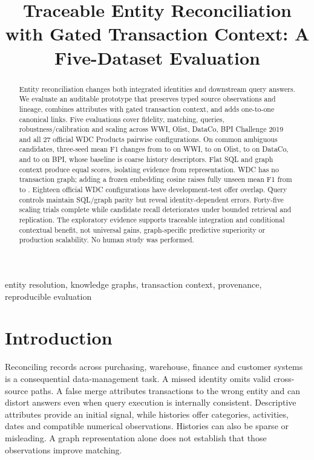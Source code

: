 \documentclass[conference,letterpaper]{IEEEtran}
\title{Traceable Entity Reconciliation with Gated Transaction Context: A Five-Dataset Evaluation}
\author{\IEEEauthorblockN{Anonymous research draft}}
\begin{document}
\maketitle
\begin{abstract}
Entity reconciliation changes both integrated identities and downstream query answers. We evaluate an auditable prototype that preserves typed source observations and lineage, combines attributes with gated transaction context, and adds one-to-one canonical links. Five evaluations cover fidelity, matching, queries, robustness/calibration and scaling across WWI, Olist, DataCo, BPI Challenge 2019 and all 27 official WDC Products pairwise configurations. On common ambiguous candidates, three-seed mean F1 changes from \FWwiAttr{} to \FWwiGraph{} on WWI, \FOlistAttr{} to \FOlistGraph{} on Olist, \FDataCoAttr{} to \FDataCoGraph{} on DataCo, and \FBpiAttr{} to \FBpiGraph{} on BPI, whose baseline is coarse history descriptors. Flat SQL and graph context produce equal scores, isolating evidence from representation. WDC has no transaction graph; adding a frozen embedding cosine raises fully unseen mean F1 from \WdcAttr{} to \WdcAug{}. Eighteen official WDC configurations have development-test offer overlap. Query controls maintain SQL/graph parity but reveal identity-dependent errors. Forty-five scaling trials complete while candidate recall deteriorates under bounded retrieval and replication. The exploratory evidence supports traceable integration and conditional contextual benefit, not universal gains, graph-specific predictive superiority or production scalability. No human study was performed.
\end{abstract}
\begin{IEEEkeywords}
entity resolution, knowledge graphs, transaction context, provenance, reproducible evaluation
\end{IEEEkeywords}

\section{Introduction}
Reconciling records across purchasing, warehouse, finance and customer systems is a consequential data-management task. A missed identity omits valid cross-source paths. A false merge attributes transactions to the wrong entity and can distort answers even when query execution is internally consistent. Descriptive attributes provide an initial signal, while histories offer categories, activities, dates and compatible numerical observations. Histories can also be sparse or misleading. A graph representation alone does not establish that those observations improve matching.
\end{document}
